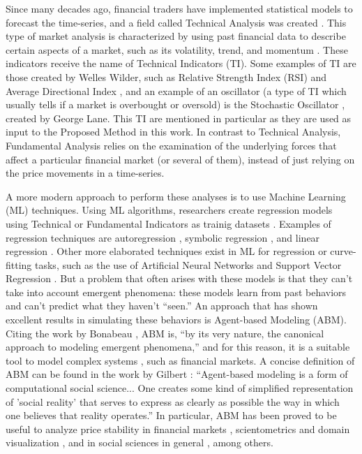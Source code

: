 \documentclass[12pt,journal,draftcls,onecolumn]{IEEEtran}
\begin{document}
Since many decades ago, financial traders have implemented statistical
models to forecast the time-series, and a field called Technical
Analysis was created \cite{lo2000foundations}. This type of market
analysis is characterized by using past financial data to describe
certain aspects of a market, such as its volatility, trend, and
momentum \cite{achelis2001technical}. These indicators receive the
name of Technical Indicators (TI). Some examples of TI are those
created by Welles Wilder, such as Relative Strength Index (RSI) and
Average Directional Index \cite{wilder1978new}, and an example of an
oscillator (a type of TI which usually tells if a market is overbought
or oversold) is the Stochastic Oscillator
\cite{schirding1984stochastic}, created by George Lane. This TI are
mentioned in particular as they are used as input to the Proposed
Method in this work. In contrast to
Technical Analysis, Fundamental Analysis relies on the examination of
the underlying forces that affect a particular financial market (or
several of them), instead of just relying on the price movements in a
time-series.

A more modern approach to perform these analyses is to use Machine
Learning (ML) techniques. Using ML algorithms,
researchers create regression models using Technical or Fundamental
Indicators as trainig datasets \cite{Connor2005}.
Examples of regression techniques are
autoregression \cite{burg1968new}, symbolic regression
\cite{billard2002symbolic}, and linear regression
\cite{kutner2004applied}. Other more elaborated techniques exist in ML
for regression or curve-fitting tasks, such as the use of Artificial
Neural Networks \cite{melin2007hybrid} and Support Vector Regression
\cite{basak2007support}. But a problem that often arises with these
models is that they can't take into account emergent phenomena: these
models learn from past behaviors and can't predict what they haven't
``seen.'' An approach that has shown excellent results in simulating
these behaviors is Agent-based Modeling (ABM). Citing the work by
Bonabeau \cite{bonabeau2002agent}, ABM is, ``by its very nature, the
canonical approach to modeling emergent phenomena,'' and for this
reason, it is a suitable tool to model complex systems
\cite{jennings2001agent}, such as financial markets. A concise
definition of ABM can be found in the work by Gilbert
\cite{gilbert2008agent}: ``Agent-based modeling is a form of
computational social science... One creates some kind of simplified
representation of 'social reality' that serves to express as clearly
as possible the way in which one believes that reality operates.'' In
particular, ABM has been proved to be useful to analyze price
stability in financial markets \cite{Pellizzari2007}, scientometrics
and domain visualization \cite{Niazi2011}, and in social sciences in
general \cite{gilbert2008agent}, among others.
\end{document}
